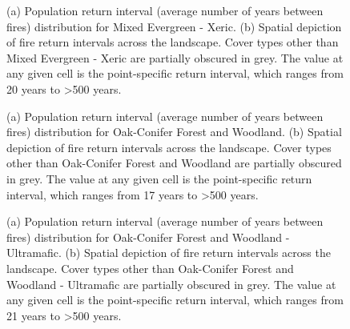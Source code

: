 \begin{figure}[!htbp]
  \centering
  \caption{(a) Population return interval (average number of years between fires) distribution for Mixed Evergreen - Xeric.  (b) Spatial depiction of fire return intervals across the landscape. Cover types other than Mixed Evergreen - Xeric are partially obscured in grey. The value at any given cell is the point-specific return interval, which ranges from 20 years to \textgreater 500 years.}
\label{fig:preturn_megx}
\end{figure}

\begin{figure}[!htbp]
  \centering
  \caption{(a) Population return interval (average number of years between fires) distribution for Oak-Conifer Forest and Woodland.  (b) Spatial depiction of fire return intervals across the landscape. Cover types other than Oak-Conifer Forest and Woodland are partially obscured in grey. The value at any given cell is the point-specific return interval, which ranges from 17 years to \textgreater 500 years.}
\label{fig:preturn_ocfw}
\end{figure}

\begin{figure}[!htbp]
  \centering
  \caption{(a) Population return interval (average number of years between fires) distribution for Oak-Conifer Forest and Woodland - Ultramafic.  (b) Spatial depiction of fire return intervals across the landscape. Cover types other than Oak-Conifer Forest and Woodland - Ultramafic are partially obscured in grey. The value at any given cell is the point-specific return interval, which ranges from 21 years to \textgreater 500 years.}
\label{fig:preturn_ocfwu}
\end{figure}

